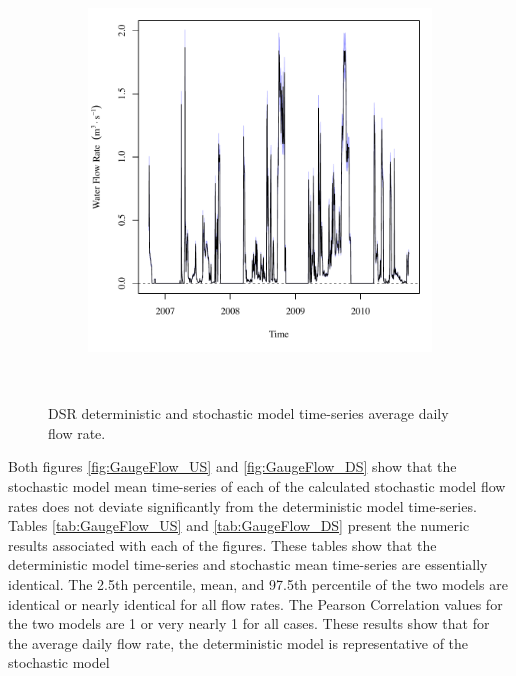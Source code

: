 \begin{linenumbers}
\begin{landscape}
\begin{figure}
\begin{subfigure}{0.7\textwidth}
		\end{subfigure}%
		\begin{subfigure}{0.7\textwidth}
			\centering
			\includegraphics[width=\tableCustomSize]{"Figures/Results_DSR/Stochastic/Q WIL"}
		\end{subfigure}\\
		\caption{DSR deterministic and stochastic model time-series average daily flow rate.}
	\end{figure}
\end{landscape}

Both figures \ref{fig:GaugeFlow_US} and \ref{fig:GaugeFlow_DS} show that the stochastic model mean time-series of each of the calculated stochastic model flow rates does not deviate significantly from the deterministic model time-series.  Tables \ref{tab:GaugeFlow_US} and \ref{tab:GaugeFlow_DS} present the numeric results associated with each of the figures.  These tables show that the deterministic model time-series and stochastic mean time-series are essentially identical.  The 2.5th percentile, mean, and 97.5th percentile of the two models are identical or nearly identical for all flow rates.  The Pearson Correlation values for the two models are 1 or very nearly 1 for all cases.  These results show that for the average daily flow rate, the deterministic model is representative of the stochastic model


\end{linenumbers}
